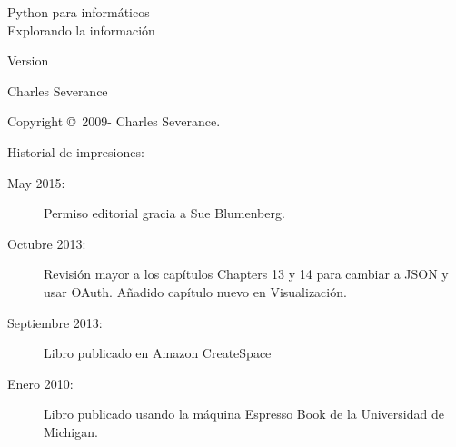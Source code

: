 



\newtheorem{ex}{Exercise}[chapter]

\begin{latexonly}

\renewcommand{\blankpage}{\thispagestyle{empty} \quad \newpage}

\thispagestyle{empty}

\begin{flushright}
\vspace*{2.0in}

\begin{spacing}{3}
{\huge Python para informáticos}\\
{\Large Explorando la información}
\end{spacing}

\vspace{0.25in}

Version \theversion

\vspace{0.5in}


{\Large
Charles Severance\\
}

\vfill

\end{flushright}

\pagebreak
\thispagestyle{empty}

{\small
Copyright \copyright ~2009- Charles Severance.


Historial de impresiones:

\begin{description}

\item[May 2015:] Permiso editorial gracia a Sue Blumenberg.

\item[Octubre 2013:] Revisión mayor a los capítulos Chapters 13 y 14
para cambiar a JSON y usar OAuth.
Añadido capítulo nuevo en Visualización.

\item[Septiembre 2013:] Libro publicado en Amazon CreateSpace

\item[Enero 2010:] Libro publicado usando la máquina
Espresso Book de la Universidad de Michigan.


\end{description}}
\end{latexonly}
